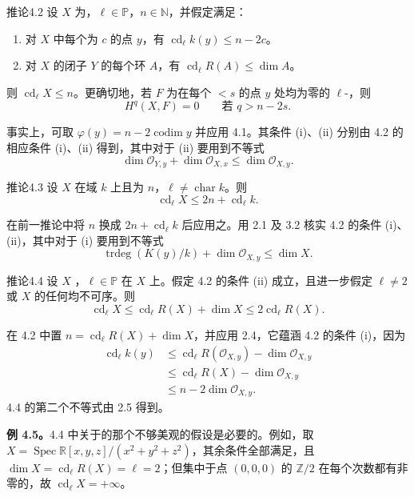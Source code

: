 \begin{SGAresult}{推论}{4.2}
设 $X$ 为，$\ell\in\mathbb P$，$n\in\mathbb N$，并假定满足：
\begin{enumerate}
\item[(i)] 对 $X$ 中每个为 $c$ 的点 $y$，有 $\operatorname{cd}_\ell k(y)\leq n-2c$。
\item[(ii)] 对 $X$ 的闭子 $Y$ 的每个环 $A$，有 $\operatorname{cd}_\ell R(A)\leq\dim A$。
\end{enumerate}
则 $\operatorname{cd}_\ell X\leq n$。更确切地，若 $F$ 为在每个 $<s$ 的点 $y$ 处均为零的 $\ell$-，则
\[
 H^q(X,F)=0\qquad\text{若 }q>n-2s.
\]
\end{SGAresult}
事实上，可取 $\varphi(y)=n-2\operatorname{codim}y$ 并应用 4.1。其条件 (i)、(ii) 分别由 4.2 的相应条件 (i)、(ii) 得到，其中对于 (ii) 要用到不等式
\[
 \dim\mathcal O_{Y,y}+\dim\mathcal O_{X,x}\leq\dim\mathcal O_{X,y}.
\]
\begin{SGAresult}{推论}{4.3}
设 $X$ 在域 $k$ 上且为 $n$，$\ell\ne\operatorname{char}k$。则
\[
 \operatorname{cd}_\ell X\leq2n+\operatorname{cd}_\ell k.
\]
\end{SGAresult}
在前一推论中将 $n$ 换成 $2n+\operatorname{cd}_\ell k$ 后应用之。用 2.1 及 3.2 核实 4.2 的条件 (i)、(ii)，其中对于 (i) 要用到不等式
\[
 \operatorname{trdeg}(K(y)/k)+\dim\mathcal O_{X,y}\leq\dim X.
\]
\begin{SGAresult}{推论}{4.4}
设 $X$ ，$\ell\in\mathbb P$ 在 $X$ 上。假定 4.2 的条件 (ii) 成立，且进一步假定 $\ell\ne2$ 或 $X$ 的任何均不可序。则
\[
 \operatorname{cd}_\ell X\leq\operatorname{cd}_\ell R(X)+\dim X\leq2\operatorname{cd}_\ell R(X).
\]
\end{SGAresult}
在 4.2 中置 $n=\operatorname{cd}_\ell R(X)+\dim X$，并应用 2.4，它蕴涵 4.2 的条件 (i)，因为
\[
\begin{split}
 \operatorname{cd}_\ell k(y)&\leq\operatorname{cd}_\ell R(\mathcal O_{X,y})-\dim\mathcal O_{X,y}\\
 &\leq\operatorname{cd}_\ell R(X)-\dim\mathcal O_{X,y}\\
 &\leq n-2\dim\mathcal O_{X,y}.
\end{split}
\]
4.4 的第二个不等式由 2.5 得到。

\textbf{例 4.5。}4.4 中关于的那个不够美观的假设是必要的。例如，取 $X=\operatorname{Spec}\mathbb R[x,y,z]/(x^2+y^2+z^2)$，其余条件全部满足，且 $\dim X=\operatorname{cd}_\ell R(X)=\ell=2$；但集中于点 $(0,0,0)$ 的 $\mathbb Z/2$ 在每个次数都有非零的，故 $\operatorname{cd}_\ell X=+\infty$。

